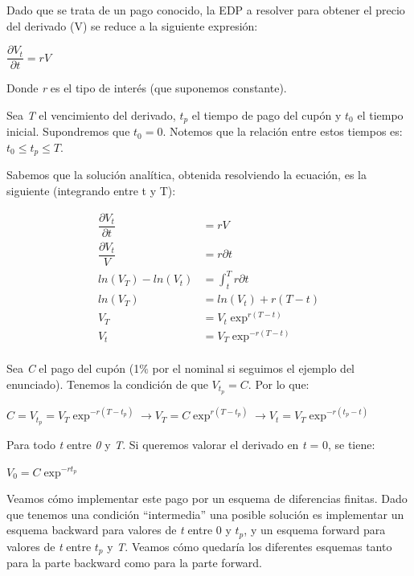 \documentclass[titlepage]{article}
\begin{document}
Dado que se trata de un pago conocido, la EDP a resolver para obtener el precio del derivado (V) se reduce a la siguiente expresión:

\begin{center}
	$\dfrac{\partial V_{t}}{\partial t} = rV$
\end{center}

Donde \textit{r} es el tipo de interés (que suponemos constante).

\vspace{5pt}
Sea \textit{T} el vencimiento del derivado, $t_{p}$ el tiempo de pago del cupón y $t_{0}$ el tiempo inicial. Supondremos que $t_{0}=0$. Notemos que la relación entre estos tiempos es: $t_{0} \leq t_{p} \leq T$.  

\vspace{5pt}
Sabemos que la solución analítica, obtenida resolviendo la ecuación, es la siguiente (integrando entre t y T):

\begin{align*}
	\dfrac{\partial V_{t}}{\partial t} &= rV \\
	\dfrac{\partial V_{t}}{V} &= r\partial t \\
	ln(V_{T}) - ln(V_{t}) &= \displaystyle \int_{t}^{T} r\partial t\\
	ln(V_{T}) &= ln(V_{t}) + r(T - t) \\
	V_{T} &= V_{t}\exp^{r(T-t)} \\
	V_{t} &= V_{T} \exp^{-r(T-t)} \\
\end{align*}

Sea \textit{C} el pago del cupón (1$\%$ por el nominal si seguimos el ejemplo del enunciado). Tenemos la condición de que $V_{t_{p}} = C$. Por lo que:

\begin{center}
	$C = V_{t_{p}} = V_{T} \exp^{-r(T-t_{p})} \longrightarrow V_{T} = C\exp^{r(T-t_{p})} \longrightarrow V_{t} = V_{T} \exp^{-r(t_{p}-t)} $
\end{center}
	
Para todo \textit{t} entre \textit{0} y \textit{T}. Si queremos valorar el derivado en  \textit{t} = 0, se tiene:

\begin{center}
	$V_{0} = C\exp^{-rt_{p}}$
\end{center}

Veamos cómo implementar este pago por un esquema de diferencias finitas. Dado que tenemos una condición “intermedia” una posible solución es implementar un esquema backward para valores de \textit{t} entre 0 y $t_{p}$, y un esquema forward para valores de \textit{t} entre $t_{p}$ y  \textit{T}. Veamos cómo quedaría los diferentes esquemas tanto para la parte backward como para la parte forward. 
\end{document}
